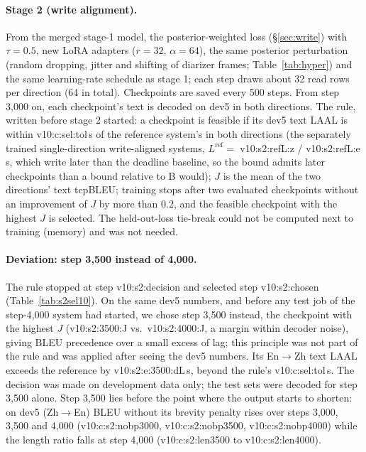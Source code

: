 \paragraph{Stage 2 (write alignment).} From the merged stage-1 model, the posterior-weighted loss (\S\ref{sec:write}) with $\tau=0.5$, new
LoRA adapters ($r=32$, $\alpha=64$), the same posterior perturbation (random dropping, jitter and shifting of diarizer frames; Table~\ref{tab:hyper}) and
the same learning-rate schedule as stage 1; each
step draws about 32 read rows per direction (64 in total). Checkpoints are saved every 500 steps. From step 3{,}000 on,
each checkpoint's text is decoded on dev5 in both directions. The rule, written before stage 2 started: a checkpoint is
feasible if its dev5 text LAAL is within \num{v10:c:sel:tol}\,s of the reference system's in both directions (the
separately trained single-direction write-aligned systems, $L^{\mathrm{ref}}=$ \num{v10:s2:refL:z} /
\num{v10:s2:refL:e}\,s, which write later than the deadline baseline, so the bound admits later checkpoints than a bound
relative to B would); $J$ is the mean of the two directions' text tcpBLEU; training stops after two evaluated
checkpoints without an improvement of $J$ by more than 0.2, and the feasible checkpoint with the highest $J$ is selected.
The held-out-loss tie-break could not be computed next to training (memory) and was not needed.



\paragraph{Deviation: step 3{,}500 instead of 4{,}000.} The rule stopped at step \num{v10:s2:decision} and selected step
\num{v10:s2:chosen} (Table~\ref{tab:s2sel10}). On the same dev5 numbers, and before any test job of the step-4{,}000
system had started, we chose step 3{,}500 instead, the checkpoint with the highest $J$ (\num{v10:s2:3500:J} vs.\
\num{v10:s2:4000:J}, a margin within decoder noise), giving BLEU precedence over a small excess of lag; this principle
was not part of the rule and was applied after seeing the dev5 numbers. Its En$\rightarrow$Zh text
LAAL exceeds the reference by \num{v10:s2:e:3500:dL}\,s, beyond the rule's \num{v10:c:sel:tol}\,s. The decision
was made on development data only; the test sets were decoded for step 3{,}500 alone. Step 3{,}500 lies before the point
where the output starts to shorten: on dev5 (Zh$\rightarrow$En) BLEU without its brevity penalty rises over steps 3{,}000,
3{,}500 and 4{,}000 (\num{v10:c:s2:nobp3000}, \num{v10:c:s2:nobp3500}, \num{v10:c:s2:nobp4000}) while the length ratio
falls at step 4{,}000 (\num{v10:c:s2:len3500} to \num{v10:c:s2:len4000}).

